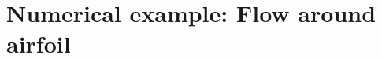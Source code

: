 \documentclass{beamer}
\begin{document}

\section{Numerical example: Flow around airfoil}
\end{document}
